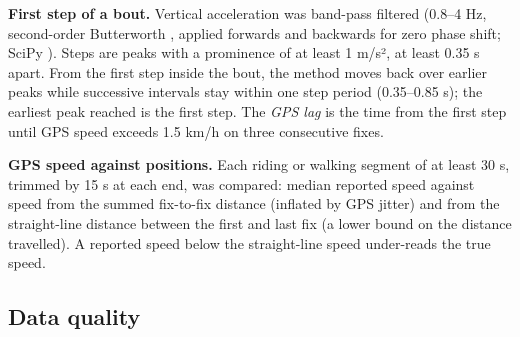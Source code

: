 \textbf{First step of a bout.} Vertical acceleration was band-pass filtered (0.8--4 Hz,
second-order Butterworth \autocite{butterworth1930}, applied forwards and backwards for
zero phase shift; SciPy \autocite{virtanen2020scipy}). Steps are peaks with a prominence of
at least 1 m/s², at least 0.35 s apart. From the first step inside the bout, the method
moves back over earlier peaks while successive intervals stay within one step period
(0.35--0.85 s); the earliest peak reached is the first step. The \emph{GPS lag} is the time
from the first step until GPS speed exceeds 1.5 km/h on three consecutive fixes.

\textbf{GPS speed against positions.} Each riding or walking segment of at least 30 s,
trimmed by 15 s at each end, was compared: median reported speed against speed from the
summed fix-to-fix distance (inflated by GPS jitter) and from the straight-line distance
between the first and last fix (a lower bound on the distance travelled). A reported
speed below the straight-line speed under-reads the true speed.

\subsection{Data quality}

